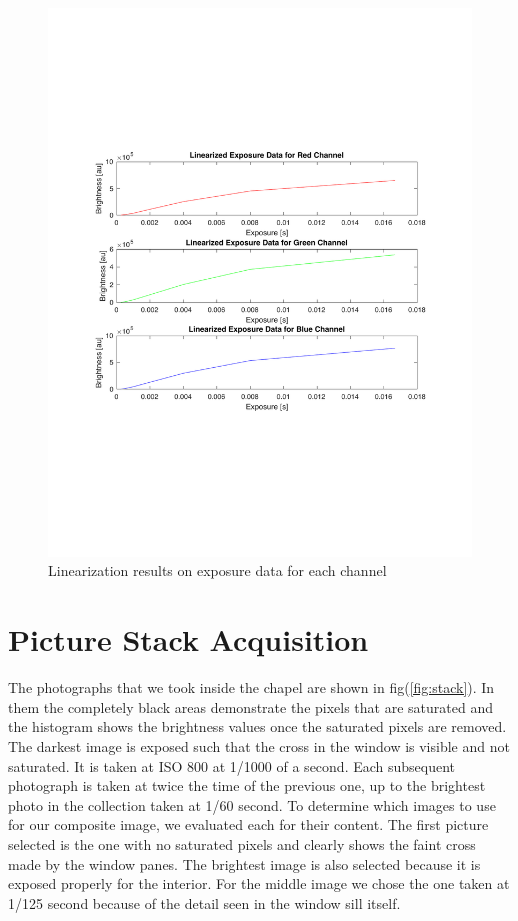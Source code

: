 \documentclass[a4paper]{article}
\begin{document}
\begin{figure}[htb!]
    \begin{center}
        \includegraphics[width=6 in]{linearExposure.pdf}
	 \end{center}
    \caption{Linearization results on exposure data for each channel} 
    \label{fig:linEx}
\end{figure}
\FloatBarrier
\section{Picture Stack Acquisition}
The photographs that we took inside the chapel are shown in fig(\ref{fig:stack}). In them the completely black areas demonstrate the pixels that are saturated and the histogram shows the brightness values once the saturated pixels are removed.  The darkest image is exposed such that the cross in the window is visible and not saturated.  It is taken at ISO 800 at 1/1000 of a second.  Each subsequent photograph is taken at twice the time of the previous one, up to the brightest photo in the collection taken at 1/60 second. To determine which images to use for our composite image, we evaluated each for their content.  The first picture selected is the one with no saturated pixels and clearly shows the faint cross made by the window panes.  The brightest image is also selected because it is exposed properly for the interior.  For the middle image we chose the one taken at 1/125 second because of the detail seen in the window sill itself. 
\end{document}
